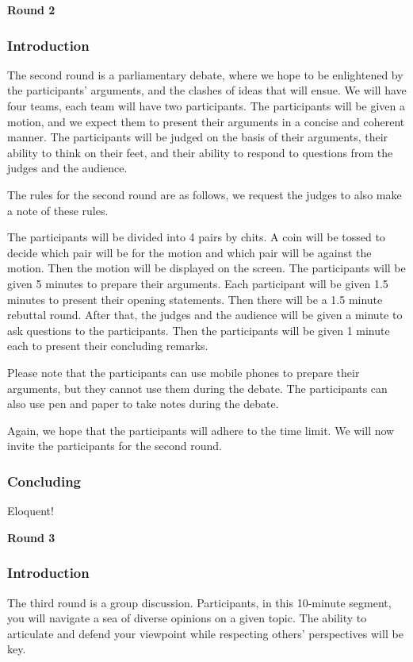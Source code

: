 \documentclass{report}
\begin{document}
\begin{center}
    \large
    \textbf{Round 2}
\end{center}

\subsubsection*{Introduction}
The second round is a parliamentary debate, where we hope to be enlightened by the participants' arguments, and the clashes of ideas that will ensue.
We will have four teams, each team will have two participants. The participants will be given a motion, and we 
expect them to present their arguments in a concise and coherent manner. The participants will be judged on the basis of their
arguments, their ability to think on their feet, and their ability to respond to questions from the judges and the audience.

The rules for the second round are as follows, we request the judges to also make a note of these rules.

The participants will be divided into 4 pairs by chits.
A coin will be tossed to decide which pair will be for the motion and which pair will be against the motion.
Then the motion will be displayed on the screen. The participants will be given 5 minutes to prepare their arguments.
Each participant will be given 1.5 minutes to present their opening statements. Then there will be a 1.5 minute rebuttal round.
After that, the judges and the audience will be given a minute to ask questions to the participants.
Then the participants will be given 1 minute each to present their concluding remarks.

Please note that the participants can use mobile phones to prepare their arguments, but they cannot use them during the debate.
The participants can also use pen and paper to take notes during the debate.

Again, we hope that the participants will adhere to the time limit. We will now invite the participants for the second round.


\subsubsection*{Concluding}
Eloquent! 

\begin{center}
    \large
    \textbf{Round 3}
\end{center}

\subsubsection*{Introduction}
The third round is a group discussion. Participants, in this 10-minute segment, you will navigate a sea of diverse opinions on a given topic. 
The ability to articulate and defend your viewpoint while respecting others' perspectives will be key. 
\end{document}
